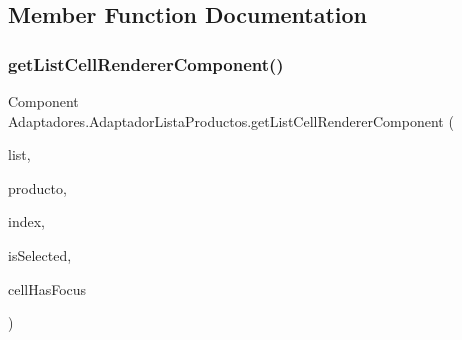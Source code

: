 \subsection{Member Function Documentation}
\mbox{\label{class_adaptadores_1_1_adaptador_lista_productos_ab58cd86bdd4c0009417f373521c6cfc4}} 
\subsubsection{\texorpdfstring{get\+List\+Cell\+Renderer\+Component()}{getListCellRendererComponent()}}
{\footnotesize\ttfamily Component Adaptadores.\+Adaptador\+Lista\+Productos.\+get\+List\+Cell\+Renderer\+Component (\begin{DoxyParamCaption}\item[{J\+List$<$? extends \mbox{\hyperlink{class_productos_1_1_producto}{Producto}} $>$}]{list,  }\item[{\mbox{\hyperlink{class_productos_1_1_producto}{Producto}}}]{producto,  }\item[{int}]{index,  }\item[{boolean}]{is\+Selected,  }\item[{boolean}]{cell\+Has\+Focus }\end{DoxyParamCaption})}

